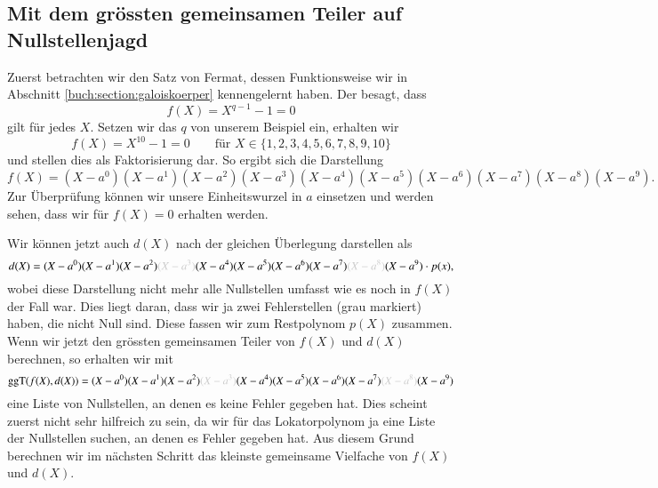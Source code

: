 \subsection{Mit dem grössten gemeinsamen Teiler auf Nullstellenjagd
\label{reedsolomon:subsection:ggT}}
%
%
Zuerst betrachten wir den Satz von Fermat, dessen Funktionsweise wir in Abschnitt \ref{buch:section:galoiskoerper} kennengelernt haben. Der besagt, dass
\[
f(X) = X^{q-1} -1 = 0
\] 
gilt für jedes $X$. Setzen wir das $q$ von unserem Beispiel ein, erhalten wir
\[
f(X) = X^{10}-1 = 0 \qquad \text{für } X \in \{1,2,3,4,5,6,7,8,9,10\}
\]
und stellen dies als Faktorisierung dar. So ergibt sich die Darstellung 
\[
f(X) = (X-a^0)(X-a^1)(X-a^2)(X-a^3)(X-a^4)(X-a^5)(X-a^6)(X-a^7)(X-a^8)(X-a^9).
\]
Zur Überprüfung können wir unsere Einheitswurzel in $a$ einsetzen und werden sehen, dass wir für $f(X) = 0$ erhalten werden.

Wir können jetzt auch $d(X)$ nach der gleichen Überlegung darstellen als 
\[
d(X) = (X-a^0)(X-a^1)(X-a^2)\textcolor{gray!40}{(X-a^3)}(X-a^4)(X-a^5)(X-a^6)(X-a^7)\textcolor{gray!40}{(X-a^8)}(X-a^9) \cdot p(x),
\]
wobei diese Darstellung nicht mehr alle Nullstellen umfasst wie es noch in $f(X)$ der Fall war. 
Dies liegt daran, dass wir ja zwei Fehlerstellen (grau markiert) haben, die nicht Null sind. Diese fassen wir zum Restpolynom $p(X)$ zusammen.
Wenn wir jetzt den grössten gemeinsamen Teiler von $f(X)$ und $d(X)$ berechnen, so erhalten wir mit 
\[
\operatorname{ggT}(f(X),d(X)) = (X-a^0)(X-a^1)(X-a^2)\textcolor{gray!40}{(X-a^3)}(X-a^4)(X-a^5)(X-a^6)(X-a^7)\textcolor{gray!40}{(X-a^8)}(X-a^9)
\]
eine Liste von Nullstellen, an denen es keine Fehler gegeben hat.
Dies scheint zuerst nicht sehr hilfreich zu sein, da wir für das Lokatorpolynom ja eine Liste der Nullstellen suchen, an denen es Fehler gegeben hat. Aus diesem Grund berechnen wir im nächsten Schritt das kleinste gemeinsame Vielfache von $f(X)$ und $d(X)$. 


